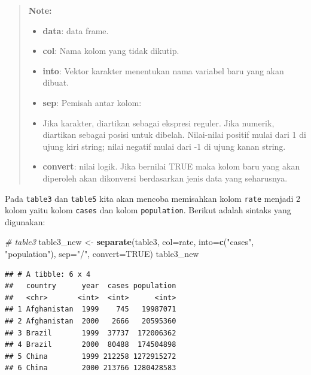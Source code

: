 \documentclass[]{book}
\newenvironment{Shaded}{\begin{snugshade}}{\end{snugshade}}
\newcommand{\KeywordTok}[1]{\textcolor[rgb]{0.13,0.29,0.53}{\textbf{#1}}}
\newcommand{\DataTypeTok}[1]{\textcolor[rgb]{0.13,0.29,0.53}{#1}}
\newcommand{\StringTok}[1]{\textcolor[rgb]{0.31,0.60,0.02}{#1}}
\newcommand{\CommentTok}[1]{\textcolor[rgb]{0.56,0.35,0.01}{\textit{#1}}}
\newcommand{\OtherTok}[1]{\textcolor[rgb]{0.56,0.35,0.01}{#1}}
\newcommand{\NormalTok}[1]{#1}
\providecommand{\tightlist}{%
  \setlength{\itemsep}{0pt}\setlength{\parskip}{0pt}}
\begin{document}
\begin{quote}
\textbf{Note: }

\begin{itemize}
\tightlist
\item
  \textbf{data}: data frame.
\item
  \textbf{col}: Nama kolom yang tidak dikutip.
\item
  \textbf{into}: Vektor karakter menentukan nama variabel baru yang akan
  dibuat.
\item
  \textbf{sep}: Pemisah antar kolom:
\item
  Jika karakter, diartikan sebagai ekspresi reguler. Jika numerik,
  diartikan sebagai posisi untuk dibelah. Nilai-nilai positif mulai dari
  1 di ujung kiri string; nilai negatif mulai dari -1 di ujung kanan
  string.
\item
  \textbf{convert}: nilai logik. Jika bernilai TRUE maka kolom baru yang
  akan diperoleh akan dikonversi berdasarkan jenis data yang seharusnya.
\end{itemize}
\end{quote}

Pada \texttt{table3} dan \texttt{table5} kita akan mencoba memisahkan
kolom \texttt{rate} menjadi 2 kolom yaitu kolom \texttt{cases} dan kolom
\texttt{population}. Berikut adalah sintaks yang digunakan:

\begin{Shaded}
\begin{Highlighting}[]
\CommentTok{# table3}
\NormalTok{table3_new <-}\StringTok{ }\KeywordTok{separate}\NormalTok{(table3, }\DataTypeTok{col=}\NormalTok{rate,}
                       \DataTypeTok{into=}\KeywordTok{c}\NormalTok{(}\StringTok{"cases"}\NormalTok{, }\StringTok{"population"}\NormalTok{),}
                       \DataTypeTok{sep=}\StringTok{"/"}\NormalTok{, }\DataTypeTok{convert=}\OtherTok{TRUE}\NormalTok{)}
\NormalTok{table3_new}
\end{Highlighting}
\end{Shaded}

\begin{verbatim}
## # A tibble: 6 x 4
##   country      year  cases population
##   <chr>       <int>  <int>      <int>
## 1 Afghanistan  1999    745   19987071
## 2 Afghanistan  2000   2666   20595360
## 3 Brazil       1999  37737  172006362
## 4 Brazil       2000  80488  174504898
## 5 China        1999 212258 1272915272
## 6 China        2000 213766 1280428583
\end{verbatim}
\end{document}
